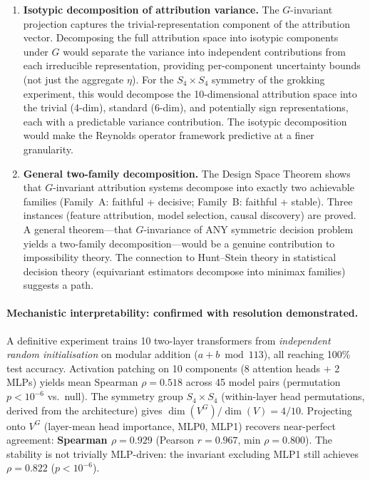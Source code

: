 \documentclass[11pt,a4paper]{article}
\begin{document}
\begin{enumerate}[label=(\arabic*)]
  \item \textbf{Isotypic decomposition of attribution variance.}  The $G$-invariant projection captures the trivial-representation component of the attribution vector.  Decomposing the full attribution space into isotypic components under $G$ would separate the variance into independent contributions from each irreducible representation, providing per-component uncertainty bounds (not just the aggregate $\eta$).  For the $S_4 \times S_4$ symmetry of the grokking experiment, this would decompose the 10-dimensional attribution space into the trivial (4-dim), standard (6-dim), and potentially sign representations, each with a predictable variance contribution.  The isotypic decomposition would make the Reynolds operator framework predictive at a finer granularity.
  \item \textbf{General two-family decomposition.}  The Design Space Theorem shows that $G$-invariant attribution systems decompose into exactly two achievable families (Family~A: faithful + decisive; Family~B: faithful + stable).  Three instances (feature attribution, model selection, causal discovery) are proved.  A general theorem---that $G$-invariance of ANY symmetric decision problem yields a two-family decomposition---would be a genuine contribution to impossibility theory.  The connection to Hunt--Stein theory in statistical decision theory (equivariant estimators decompose into minimax families) suggests a path.
\end{enumerate}

\paragraph{Mechanistic interpretability: confirmed with resolution demonstrated.}
A definitive experiment trains 10 two-layer transformers from \emph{independent random initialisation} on modular addition ($a + b \bmod 113$), all reaching 100\% test accuracy. Activation patching on 10 components (8 attention heads $+$ 2 MLPs) yields mean Spearman $\rho = 0.518$ across 45 model pairs (permutation $p < 10^{-6}$ vs.\ null). The symmetry group $S_4 \times S_4$ (within-layer head permutations, derived from the architecture) gives $\dim(V^G)/\dim(V) = 4/10$. Projecting onto $V^G$ (layer-mean head importance, MLP0, MLP1) recovers near-perfect agreement: \textbf{Spearman $\rho = 0.929$} (Pearson $r = 0.967$, min $\rho = 0.800$). The stability is not trivially MLP-driven: the invariant excluding MLP1 still achieves $\rho = 0.822$ ($p < 10^{-6}$).
\end{document}
